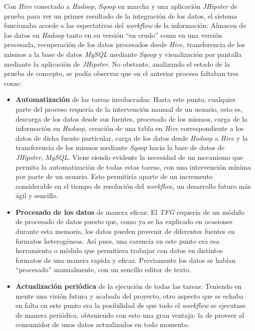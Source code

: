 \par
Con \textit{Hive} conectado a \textit{Hadoop}, \textit{Sqoop} en marcha y una aplicación \textit{JHipster} de prueba para ver un primer resultado de la integración de los datos, el sistema funcionaba acorde a las espectativas del \textit{workflow} de la información: Almacen de los datos en \textit{Hadoop} tanto en su versión ``en crudo'' como en una versión procesada, recuperación de los datos procesados desde \textit{Hive}, transferencia de los mismos a la base de datos \textit{MySQL} mediante \textit{Sqoop} y visualización por pantalla mediante la aplicación de \textit{JHipster}. No obstante, analizando el estado de la prueba de concepto, se podía observar que en el anterior proceso faltaban tres cosas: 
\begin{itemize}
\item \textbf{Automatización} de las tareas involucradas: Hasta este punto, cualquier parte del proceso requería de la intervención manual de un usuario, esto es, descarga de los datos desde sus fuentes, procesado de los mismos, carga de la información en \textit{Hadoop}, creación de una tabla en \textit{Hive} correspondiente a los datos de dicha fuente particular, carga de los datos desde \textit{Hadoop} a \textit{Hive} y la transferencia de los mismos mediante \textit{Sqoop} hacia la base de datos de \textit{JHipster}, \textit{MySQL}. Viene siendo evidente la necesidad de un mecanismo que permita la automatización de todas estas tareas, con una intervención mínima por parte de un usuario. Esto permitiría aparte de un incremento considerable en el tiempo de resolución del \textit{workflow}, un desarrollo futuro más ágil y sencillo. 
\item \textbf{Procesado de los datos} de manera eficaz: El \textit{TFG} requería de un módulo de procesado de datos puesto que, como ya se ha explicado en ocasiones durante esta memoria, los datos pueden provenir de diferentes fuentes en formatos heterogéneos. Así pues, una carencia en este punto era esa herramienta o módulo que permitiera trabajar con datos en distintos formatos de una manera rapida y eficaz. Previamente los datos se habían ``procesado'' manualmente, con un sencillo editor de texto. 
\item \textbf{Actualización periódica} de la ejecución de todas las tareas: Teniendo en mente una visión futura y acabada del proyecto, otro aspecto que se echaba en falta en este punto era la posibilidad de que todo el \textit{workflow} se ejecutase de manera periódica, obteniendo con esto una gran ventaja: la de proveer al consumidor de unos datos actualizados en todo momento. 
\end{itemize}


